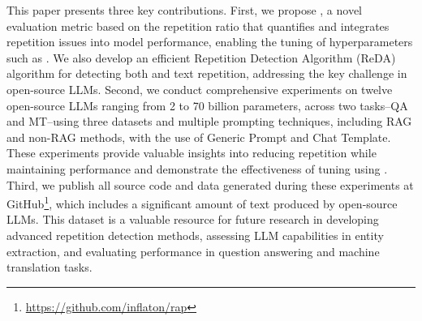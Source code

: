This paper presents three key contributions. 
First, we propose \rap, a novel evaluation metric based on the repetition ratio that quantifies and integrates repetition issues into model performance, enabling the tuning of hyperparameters such as \rpp. We also develop an efficient Repetition Detection Algorithm (ReDA) algorithm for detecting both \nwc and text repetition, addressing  the key challenge in open-source LLMs. 
Second, we conduct comprehensive experiments on twelve open-source LLMs ranging from 2 to 70 billion parameters, across two tasks--QA and MT--using three datasets and multiple prompting techniques, including RAG and non-RAG methods, with the use of Generic Prompt and Chat Template. These experiments provide valuable insights into reducing repetition while maintaining performance and demonstrate the effectiveness of tuning \rpp using \rap.
Third, we publish all source code and data generated during these experiments at GitHub\footnote{\url{https://github.com/inflaton/rap}}, which includes a significant amount of text produced by open-source LLMs. This dataset is a valuable resource for future research in developing advanced repetition detection methods, assessing LLM capabilities in entity extraction, and evaluating performance in question answering and machine translation tasks.







